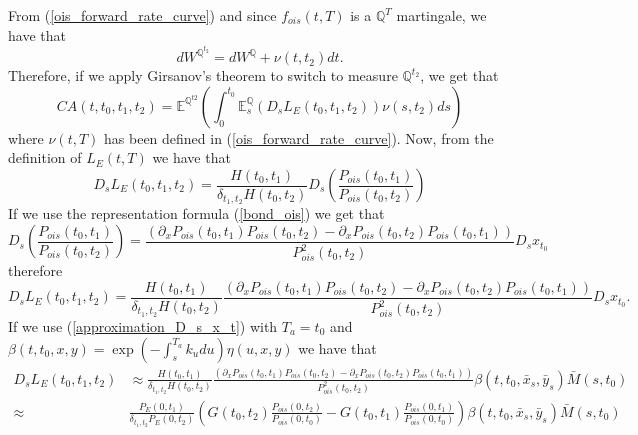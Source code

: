 \documentclass[a4paper,10pt]{article}
\newcommand{\1}{\mathbf{1}}
\begin{document}
From (\ref{ois_forward_rate_curve}) and since $f_{ois}(t,T)$ is a $\mathbb{Q}^{T}$ martingale, we have that
\begin{equation}\label{girsanov_spot_forward}
dW^{\mathbb{Q}^{t_2}} = dW^{\mathbb{Q}} + \nu(t,t_2) dt. 
\end{equation}
Therefore, if we apply Girsanov's theorem to switch to measure $\mathbb{Q}^{t_2}$, we get that
\begin{equation}\label{ca_general_future}
CA(t, t_0, t_1, t_2) = \mathbb{E}^{\mathbb{Q}^{t2}}\left(\int_{0}^{t_0} \mathbb{E}^{\mathbb{Q}}_{s}\left(D_s L_{E}(t_0,t_1,t_2) \right) \nu(s,t_2) ds \right)
\end{equation}
where $\nu(t,T)$ has been defined in (\ref{ois_forward_rate_curve}). Now, from the definition of $L_{E}(t,T)$ we have that
\begin{equation*}
D_s L_{E}(t_0,t_1,t_2) = \frac{H(t_0,t_1)}{\delta_{t_1,t_2}H(t_0,t_2)} D_s \left(\frac{P_{ois}(t_0,t_1)}{P_{ois}(t_0,t_2)}\right) 
\end{equation*}
If we use the representation formula (\ref{bond_ois}) we get that
\begin{equation*}
D_s \left(\frac{P_{ois}(t_0,t_1)}{P_{ois}(t_0,t_2)}\right) = \frac{\left(\partial_{x}P_{ois}(t_0,t_1)P_{ois}(t_0,t_2) - \partial_{x}P_{ois}(t_0,t_2) P_{ois}(t_0,t_1) \right)}{P^{2}_{ois}(t_0,t_2)} D_s x_{t_0}
\end{equation*}
therefore
\begin{equation}\label{malliavin_derive_L}
D_s L_{E}(t_0,t_1,t_2) = \frac{H(t_0,t_1)}{\delta_{t_1,t_2}H(t_0,t_2)}\frac{\left(\partial_{x}P_{ois}(t_0,t_1)P_{ois}(t_0,t_2) - \partial_{x}P_{ois}(t_0,t_2) P_{ois}(t_0,t_1) \right)}{P^{2}_{ois}(t_0,t_2)} D_s x_{t_0}. 
\end{equation}
If we use (\ref{approximation_D_s_x_t}) with $T_a=t_0$ and $\beta(t,t_0,x,y) = \exp\left(-\int_{s}^{T_a}k_u du \right) \eta(u,x,y)$ we have that
\begin{align*}
D_s L_{E}(t_0,t_1,t_2) &\approx \frac{H(t_0,t_1)}{\delta_{t_1,t_2}H(t_0,t_2)}\frac{\left(\partial_{x}P_{ois}(t_0,t_1)P_{ois}(t_0,t_2) - \partial_{x}P_{ois}(t_0,t_2) P_{ois}(t_0,t_1) \right)}{P^{2}_{ois}(t_0,t_2)} \beta(t,t_0,\bar{x}_s,\bar{y}_s)\bar{M}(s,t_0) \nonumber \\
\approx& \frac{P_{E}(0,t_1)}{\delta_{t_1,t_2} P_{E}(0,t_2)} \left(G(t_0,t_2) \frac{P_{ois}(0,t_2)}{P_{ois}(0,t_0)} - G(t_0,t_1) \frac{P_{ois}(0,t_1)}{P_{ois}(0,t_0)} \right)\beta(t,t_0,\bar{x}_s,\bar{y}_s)\bar{M}(s,t_0)
\end{align*}
\end{document}
